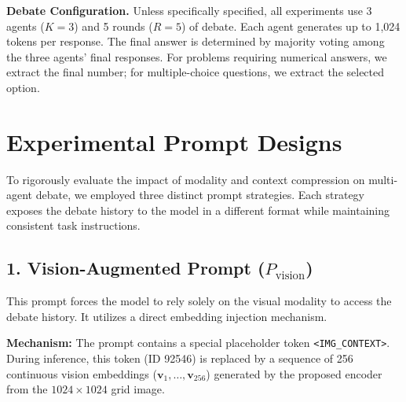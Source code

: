 \documentclass{article}
\theoremstyle{plain}
\theoremstyle{definition}
\theoremstyle{remark}
\begin{document}
\textbf{Debate Configuration.}
Unless specifically specified, all experiments use 3 agents ($K=3$) and 5 rounds ($R=5$) of debate. Each agent generates up to 1,024 tokens per response. The final answer is 
determined by majority voting among the three agents' final responses. For problems 
requiring numerical answers, we extract the final number; for multiple-choice questions, 
we extract the selected option.






\section{Experimental Prompt Designs}
\label{sect: prompt}



To rigorously evaluate the impact of modality and context compression on multi-agent debate, we employed three distinct prompt strategies. Each strategy exposes the debate history to the model in a different format while maintaining consistent task instructions.

\subsection{1. Vision-Augmented Prompt ($P_{\text{vision}}$)}
This prompt forces the model to rely solely on the visual modality to access the debate history. It utilizes a direct embedding injection mechanism.

\textbf{Mechanism:} The prompt contains a special placeholder token \texttt{<IMG\_CONTEXT>}. During inference, this token (ID 92546) is replaced by a sequence of 256 continuous vision embeddings ($\mathbf{v}_1, \dots, \mathbf{v}_{256}$) generated by the proposed encoder from the $1024 \times 1024$ grid image.
\end{document}
